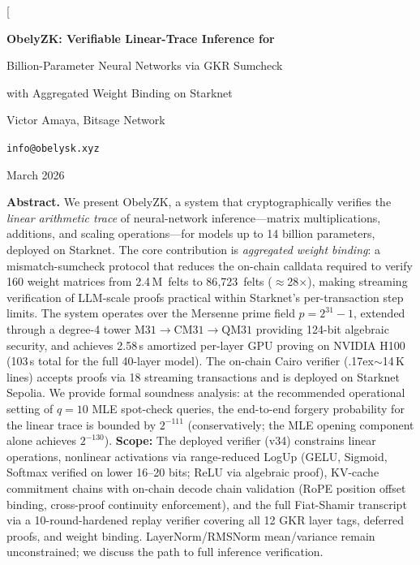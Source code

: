 \documentclass[10pt,twocolumn]{article}
\theoremstyle{definition}
\theoremstyle{remark}
\newcommand{\M}{\mathrm{M31}}
\newcommand{\CM}{\mathrm{CM31}}
\newcommand{\QM}{\mathrm{QM31}}
\begin{document}
\makeatletter
\twocolumn[
\begin{@twocolumnfalse}
\begin{center}
  {\LARGE\bfseries ObelyZK: Verifiable Linear-Trace Inference for\par
   \vspace{4pt}
   Billion-Parameter Neural Networks via GKR Sumcheck\par
   \vspace{4pt}
   with Aggregated Weight Binding on Starknet}

  \vspace{12pt}

  {\large Victor Amaya, Bitsage Network}\par
  \vspace{4pt}
  {\small\texttt{info@obelysk.xyz}}

  \vspace{8pt}

  {\small March 2026}

  \vspace{10pt}

  \begin{minipage}{0.92\textwidth}
    \small\textbf{Abstract.}
    We present ObelyZK, a system that cryptographically verifies the
    \emph{linear arithmetic trace} of neural-network inference---matrix
    multiplications, additions, and scaling operations---for models up
    to 14 billion parameters, deployed on Starknet.
    The core contribution is \emph{aggregated weight binding}: a
    mismatch-sumcheck protocol that reduces the on-chain calldata
    required to verify 160 weight matrices from 2.4\,M~felts to
    86{,}723~felts ($\approx$28$\times$), making streaming
    verification of LLM-scale proofs practical within Starknet's
    per-transaction step limits.
    The system operates over the Mersenne prime field
    $p = 2^{31}-1$, extended through a degree-4 tower
    $\M \to \CM \to \QM$ providing 124-bit algebraic security,
    and achieves 2.58\,s amortized per-layer GPU proving on NVIDIA H100
    (103\,s total for the full 40-layer model).
    The on-chain Cairo verifier ({\raise.17ex\hbox{$\scriptstyle\sim$}}14\,K
    lines) accepts proofs via 18 streaming transactions and is
    deployed on Starknet Sepolia.
    We provide formal soundness analysis: at the recommended
    operational setting of $q=10$ MLE spot-check queries,
    the end-to-end forgery probability for the linear trace
    is bounded by $2^{-111}$ (conservatively; the MLE opening
    component alone achieves $2^{-130}$).
    \textbf{Scope:} The deployed verifier (v34) constrains
    linear operations, nonlinear activations
    via range-reduced LogUp (GELU, Sigmoid, Softmax verified
    on lower 16--20 bits; ReLU via algebraic proof),
    KV-cache commitment chains with on-chain decode chain
    validation (RoPE position offset binding, cross-proof
    continuity enforcement), and
    the full Fiat-Shamir transcript via a 10-round-hardened
    replay verifier covering all 12 GKR layer tags,
    deferred proofs, and weight binding.
    LayerNorm/RMSNorm mean/variance remain unconstrained;
    we discuss the path to full inference verification.
  \end{minipage}


\end{center}
\end{@twocolumnfalse}
\end{document}
